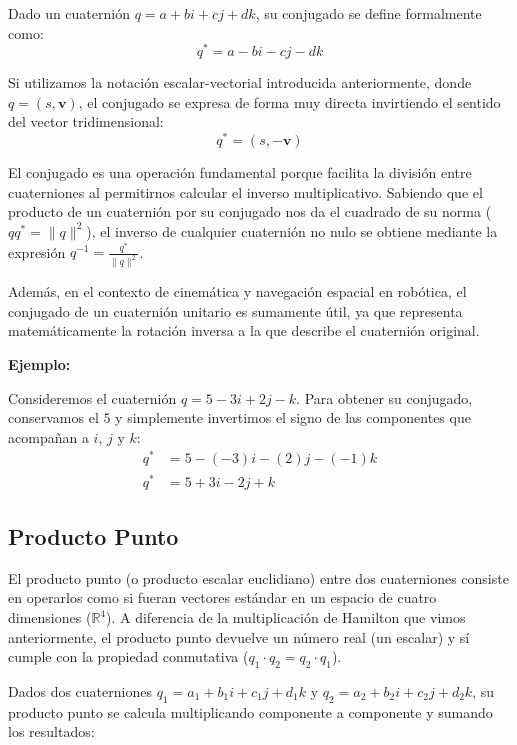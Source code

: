 Dado un cuaternión $q = a + bi + cj + dk$, su conjugado se define formalmente como:
\begin{equation}
    q^* = a - bi - cj - dk
\end{equation}

Si utilizamos la notación escalar-vectorial introducida anteriormente, donde $q = (s, \mathbf{v})$, el conjugado se expresa de forma muy directa invirtiendo el sentido del vector tridimensional:
\begin{equation}
    q^* = (s, -\mathbf{v})
\end{equation}

El conjugado es una operación fundamental porque facilita la división entre cuaterniones al permitirnos calcular el inverso multiplicativo. Sabiendo que el producto de un cuaternión por su conjugado nos da el cuadrado de su norma ($q q^* = \lVert q \rVert^2$), el inverso de cualquier cuaternión no nulo se obtiene mediante la expresión $q^{-1} = \frac{q^*}{\lVert q \rVert^2}$. 

Además, en el contexto de cinemática y navegación espacial en robótica, el conjugado de un cuaternión unitario es sumamente útil, ya que representa matemáticamente la rotación inversa a la que describe el cuaternión original.

\textbf{Ejemplo:}

Consideremos el cuaternión $q = 5 - 3i + 2j - k$. Para obtener su conjugado, conservamos el $5$ y simplemente invertimos el signo de las componentes que acompañan a $i$, $j$ y $k$:
\begin{align*}
    q^* &= 5 - (-3)i - (2)j - (-1)k \\
    q^* &= 5 + 3i - 2j + k
\end{align*}


\subsection{Producto Punto}
El producto punto (o producto escalar euclidiano) entre dos cuaterniones consiste en operarlos como si fueran vectores estándar en un espacio de cuatro dimensiones ($\mathbb{R}^4$). A diferencia de la multiplicación de Hamilton que vimos anteriormente, el producto punto devuelve un número real (un escalar) y sí cumple con la propiedad conmutativa ($q_1 \cdot q_2 = q_2 \cdot q_1$).

Dados dos cuaterniones $q_1 = a_1 + b_1i + c_1j + d_1k$ y $q_2 = a_2 + b_2i + c_2j + d_2k$, su producto punto se calcula multiplicando componente a componente y sumando los resultados:

